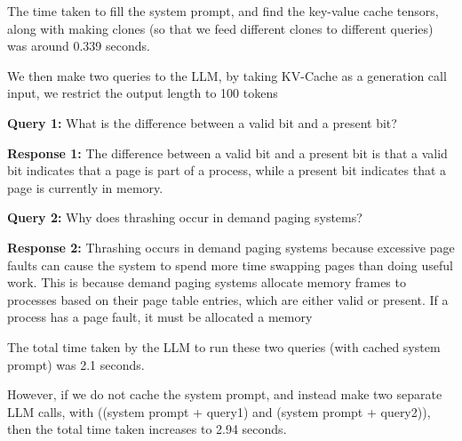 The time taken to fill the system prompt, and find the key-value cache tensors, along with making clones (so that we feed different clones to different queries) was around 0.339 seconds.


We then make two queries to the LLM, by taking KV-Cache as a generation call input, we restrict the output length to 100 tokens

\begin{tcolorbox}[colback=gray!10, colframe=gray!60!black, sharp corners, boxrule=0.5pt, left=4pt, right=4pt, top=4pt, bottom=4pt]
\small
\textbf{Query 1:} What is the difference between a valid bit and a present bit?
\end{tcolorbox}

\begin{tcolorbox}[colback=gray!10, colframe=gray!60!black, sharp corners, boxrule=0.5pt, left=4pt, right=4pt, top=4pt, bottom=4pt]
\small
\textbf{Response 1:} The difference between a valid bit and a present bit is that a valid bit indicates that a page is part of a process, while a present bit indicates that a page is currently in memory.
\end{tcolorbox}


\begin{tcolorbox}[colback=gray!10, colframe=gray!60!black, sharp corners, boxrule=0.5pt, left=4pt, right=4pt, top=4pt, bottom=4pt]
\small
\textbf{Query 2:} Why does thrashing occur in demand paging systems?
\end{tcolorbox}

\begin{tcolorbox}[colback=gray!10, colframe=gray!60!black, sharp corners, boxrule=0.5pt, left=4pt, right=4pt, top=4pt, bottom=4pt]
\small
\textbf{Response 2:} Thrashing occurs in demand paging systems because excessive page faults can cause the system to spend more time swapping pages than doing useful work. This is because demand paging systems allocate memory frames to processes based on their page table entries, which are either valid or present. If a process has a page fault, it must be allocated a memory
\end{tcolorbox}


The total time taken by the LLM to run these two queries (with cached system prompt) was 2.1 seconds.


However, if we do not cache the system prompt, and instead make two separate LLM calls, with ((system prompt + query1) and (system prompt + query2)), then the total time taken increases to 2.94 seconds.


